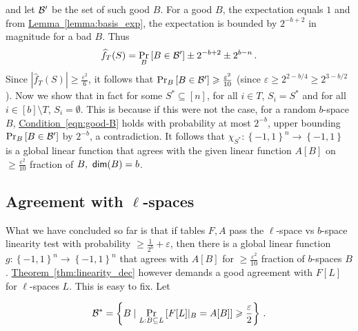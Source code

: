 \documentclass[11pt]{article}
\numberwithin{equation}{section}
\theoremstyle{definition}
\theoremstyle{plain}
\newcommand{\expref}[2]{\hyperref[#2]{#1~\ref{#2}}}
\newcommand{\expeqref}[2]{\hyperref[#2]{#1~\eqref{#2}}}
\newcommand\set[1]{{\left\{ #1 \right\}}}
\newcommand\Prob[2]{{\Pr_{#1}\left[ {#2} \right]}}
\newcommand\cube[1]{ { \set{-1,1}^{#1} } }
\newcommand\eps{\varepsilon}
\renewcommand\geq{\geqslant}
\begin{document}
and let ${\cal B}'$ be the set of such good $B$.
For a good $B$, the expectation equals $1$ and from \expref{Lemma}{lemma:basis_exp},
the expectation is bounded by
$2^{-b+2}$
%
in magnitude for a bad $B$. Thus
$$  \widehat{f}_T(S)  =  \Prob{B}{B \in {\cal B}'}  \pm 2^{-b+2} \pm 2^{b-n}\,. $$
Since $|  \widehat{f}_T(S)| \geq \frac{\eps^2}{6}$, it follows that $\Prob{B}{B \in {\cal B}'} \geq \frac{\eps^2}{10}$ (since $\eps \geq 2^{2-b/4}\geqslant 2^{3-b/2}$). %
%
Now we show that in fact for some $S^* \subseteq [n]$, for all $i \in T$, $S_i = S^*$ and for all $i \in [b]\setminus T$, $S_i = \emptyset$. This is
because if this were not the case, for a random $b$-space $B$, \expeqref{Condition}{eqn:good-B} holds with probability at most $2^{-b}$, upper
bounding  $\Prob{B}{B \in {\cal B}' }$  by $2^{-b}$, a contradiction. It follows that $\chi_{S^*}: \cube{n}\to \cube{}$ is a global linear function
that agrees with the given linear function $A[B]$ on $\geq \frac{\eps^2}{10}$ fraction of $B, ~{\sf dim}(B)=b$.

%
\subsection{Agreement with \texorpdfstring{$\ell$-spaces}{l-spaces}}
What we have concluded so far is that if tables $F, A$ pass
the $\ell$-space vs $b$-space linearity test with probability $\geq \frac{1}{2^b} + \eps$, then there is a
global linear function $g: \cube{n} \to \cube{n}$ that agrees with $A[B]$ for $\geq  \frac{\eps^2}{10}$ fraction of $b$-spaces $B$. \expref{Theorem}{thm:linearity_dec} however demands a good agreement with $F[L]$ for $\ell$-spaces $L$. This is easy to fix. Let

 $$ {\cal B}^* =
 \left\{ B \mid \Prob{L: B \subseteq L}{F[L]|_B = A[B]}  \geq \frac{\eps}{2} \right\}\,. $$%
\end{document}
